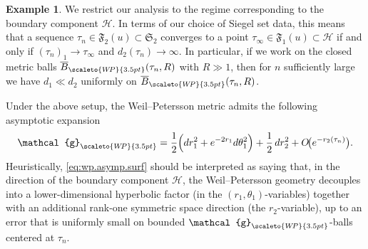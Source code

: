 \documentclass[11pt]{amsart}
\theoremstyle{plain}
\theoremstyle{definition}
\newtheorem{example}[theorem]{Example}
\theoremstyle{remark}
\newcommand{\fS}{\mathfrak{S}}
\newcommand{\g}{\mathcal{g}}
\newcommand{\cH}{\mathcal{H}}
\newcommand{\fF}{\mathfrak{F}}
\newcommand{\WP}{\scaleto{W\!P}{3.5pt}}
\begin{document}
\begin{example}
We restrict our analysis to the regime corresponding to the boundary component $\cH$. In terms of our choice of Siegel set data, this means that a sequence $\tau_n\in \fF_2(u)\subset\fS_2$ converges to a point $\tau_{\infty}\in \fF_1(u)\subset\cH$ if and only if $(\tau_n)_1\to \tau_\infty$ and $d_2(\tau_n)\to \infty$. In particular, if we work on the closed metric balls $\overline B_{\WP}(\tau_n,R)$ with $R\gg 1$, then for $n$ sufficiently large we have $d_1\ll d_2$ uniformly on $\overline B_{\WP}(\tau_n,R)$. 

Under the above setup, the Weil--Petersson metric admits the following asymptotic expansion
\begin{equation}
    \label{eq:wp.asymp.surf}
    \g_{\WP}
    = \frac{1}{2}\Bigl( dr_1^2+ e^{-2r_1}d\theta_1^2 \Bigr)
      + \frac{1}{2}\,dr_2^2
      + O\!\bigl(e^{-r_2(\tau_n)}\bigr).
\end{equation}
Heuristically, \eqref{eq:wp.asymp.surf} should be interpreted as saying that, in the direction of the boundary component $\cH$, the
Weil--Petersson geometry decouples into a lower-dimensional hyperbolic factor (in the $(r_1,\theta_1)$-variables)
together with an additional rank-one symmetric space direction (the $r_2$-variable), up to an error that is
uniformly small on bounded $\g_{\WP}$-balls centered at $\tau_n$.


\end{example}
\end{document}
